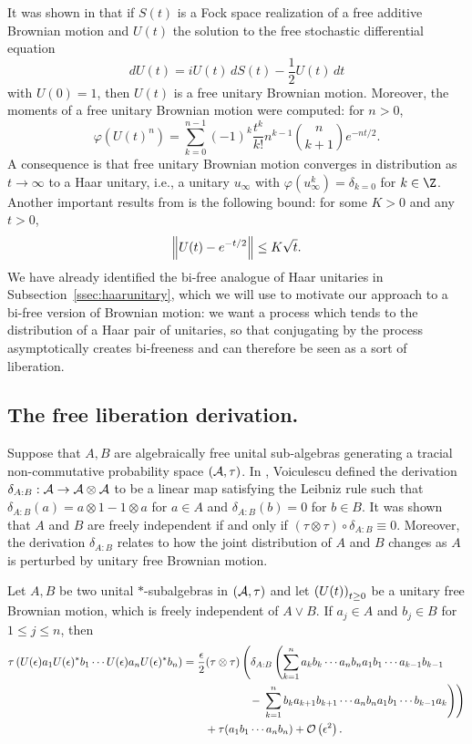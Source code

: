 It was shown in \cite{biane1997free} that if $S(t)$ is a Fock space realization of a free additive Brownian motion and $U(t)$ the solution to the free stochastic differential equation
$$dU(t) = iU(t)\,dS(t) - \frac12 U(t)\,dt$$
with $U(0) = 1$, then $U(t)$ is a free unitary Brownian motion.
Moreover, the moments of a free unitary Brownian motion were computed: for $n > 0$,
$$\varphi(U(t)^n) = \sum_{k=0}^{n-1}(-1)^k\frac{t^k}{k!}n^{k-1}{n \choose k+1}e^{-nt/2}.$$
A consequence is that free unitary Brownian motion converges in distribution as $t\to\infty$ to a Haar unitary, i.e., a unitary $u_\infty$ with $\varphi(u_\infty^{k}) = \delta_{k=0}$ for $k \in \Z$.
Another important results from \cite{biane1997free} is the following bound: for some $K > 0$ and any $t > 0$,
$$\left\|U(t)-e^{-t/2}\right\| \leq K\sqrt{t}.$$
We have already identified the bi-free analogue of Haar unitaries in Subsection~\ref{ssec:haarunitary}, which we will use to motivate our approach to a bi-free version of Brownian motion: we want a process which tends to the distribution of a Haar pair of unitaries, so that conjugating by the process asymptotically creates bi-freeness and can therefore be seen as a sort of liberation.





\subsection{The free liberation derivation.}
Suppose that $A, B$ are algebraically free unital sub-algebras generating a tracial non-commutative probability space $(\mathcal{A}, \tau)$.
In \cite{Voiculescu1999101}, Voiculescu defined the derivation $\delta_{A:B} : \mathcal{A} \to \mathcal{A}\otimes\mathcal{A}$ to be a linear map satisfying the Leibniz rule such that $\delta_{A:B}(a) = a\otimes1-1\otimes a$ for $a \in A$ and $\delta_{A:B}(b) = 0$ for $b \in B$.
It was shown that $A$ and $B$ are freely independent if and only if $(\tau\otimes\tau)\circ\delta_{A:B} \equiv 0$.
Moreover, the derivation $\delta_{A:B}$ relates to how the joint distribution of $A$ and $B$ changes as $A$ is perturbed by unitary free Brownian motion.
\begin{proposition}
	Let $A, B$ be two unital $*$-subalgebras in $(\mathcal{A}, \tau)$ and let $\left(U(t)\right)_{t\geq0}$ be a unitary free Brownian motion, which is freely independent of $A\vee B$.
	If $a_j \in A$ and $b_j \in B$ for $1\leq j \leq n$, then
	\begin{align*}
		\tau\left(U(\epsilon)a_1U(\epsilon)^*b_1\cdots U(\epsilon)a_nU(\epsilon)^*b_n\right) 
		&= 
		\frac\epsilon2(\tau\otimes\tau)\left(\delta_{A:B}\left(\sum_{k=1}^n a_kb_k\cdots a_nb_na_1b_1\cdots a_{k-1}b_{k-1} \right.\right.\\
		&\qquad\qquad\qquad- \left.\left.\sum_{k=1}^n b_ka_{k+1}b_{k+1}\cdots a_nb_na_1b_1\cdots b_{k-1}a_k\right)\right) \\
		&\qquad+\tau(a_1b_1\cdots a_nb_n) + \mathcal{O}\left(\epsilon^2\right).
	\end{align*}
\end{proposition}

